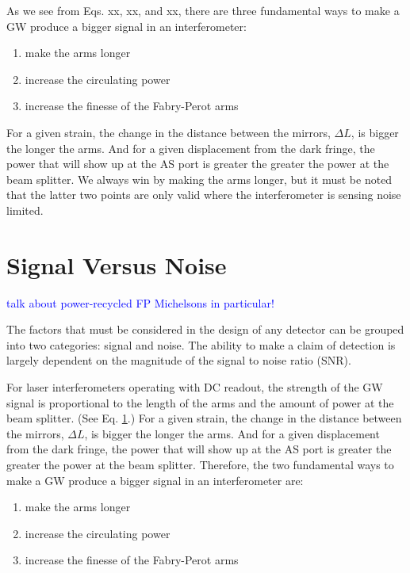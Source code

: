 As we see from Eqs. xx, xx, and xx, there are three fundamental ways
to make a GW produce a bigger signal in an interferometer:
\begin{enumerate}
\item make the arms longer \vspace{-10 pt}
\item increase the circulating power \vspace{-10 pt}
\item increase the finesse of the Fabry-Perot arms
\end{enumerate}
For a given strain, the change in the distance between the mirrors,
$\Delta L$, is bigger the longer the arms. And for a given
displacement from the dark fringe, the power that will show up at the
AS port is greater the greater the power at the beam splitter. We
always win by making the arms longer, but it must be noted that the
latter two points are only valid where the interferometer is sensing
noise limited.



\section{Signal Versus Noise}

\textcolor{blue}{talk about power-recycled FP Michelsons in particular!}

The factors that must be considered in the design of any detector can
be grouped into two categories: signal and noise. The ability to make
a claim of detection is largely dependent on the magnitude of the
signal to noise ratio (SNR). 

For laser interferometers operating with DC readout, the strength of
the GW signal is proportional to the length of the arms and the amount
of power at the beam splitter. (See Eq. \ref{}.) For a given strain,
the change in the distance between the mirrors, $\Delta L$, is bigger
the longer the arms. And for a given displacement from the dark
fringe, the power that will show up at the AS port is greater the
greater the power at the beam splitter. Therefore, the two fundamental
ways to make a GW produce a bigger signal in an interferometer are:
\begin{enumerate}
\item make the arms longer \vspace{-10 pt}
\item increase the circulating power \vspace{-10 pt}
\item increase the finesse of the Fabry-Perot arms
\end{enumerate}

